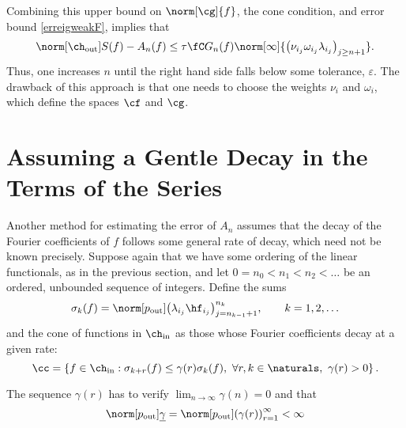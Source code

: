 \documentclass[final]{elsarticle}
\newcommand{\chin}{\ch_{\text{\rm{in}}}}
\newcommand{\chout}{\ch_{\text{\rm{out}}}}
\newcommand{\pout}{p_{\text{\rm{out}}}}
\theoremstyle{definition}
\theoremstyle{remark}
\begin{document}
Combining this upper bound on $\norm[\cg]{f}$, the cone condition, and error bound \eqref{erreigweakF}, implies that
\begin{equation*}
\norm[\chout]{S(f)-A_n(f)} \le \tau \fC G_n(f) \norm[\infty]{\left(\nu_{i_j} \omega_{i_j} \lambda_{i_j} \right)_{j\ge n+1}}.
\end{equation*}
Thus, one increases $n$ until the right hand side falls below some tolerance, $\varepsilon$.  The drawback of this approach is that one needs to choose the weights $\nu_i$ and $\omega_i$, which define the spaces $\cf$ and $\cg$.




\section{Assuming a Gentle Decay in the Terms of the Series}

Another method for estimating the error of $A_n$ assumes that the decay of the Fourier coefficients of $f$ follows some general rate of decay, which need not be known precisely.  Suppose again that we have some ordering of the linear functionals, as in the previous section, and let $0=n_0 < n_1 < n_2 < \ldots$ be an ordered, unbounded sequence of integers.  Define the sums
\begin{equation} \label{sumdef}
\sigma_k(f) = \norm[\pout]{ \left(\lambda_{i_j} \hf_{i_j} \right)_{j=n_{k-1}+1}^{n_k}}, \qquad k=1, 2, \ldots
\end{equation}
and the cone of functions in $\chin$ as those whose Fourier coefficients decay at a given rate:
\begin{equation} \label{decayconedef}
\cc = \left\{ f \in \chin : \sigma_{k+r}(f) \le \gamma(r) \sigma_k (f), \ \forall r, k \in \naturals, \ \gamma(r) > 0 \right\}.
\end{equation}

The sequence $\gamma(r)$ has to verify $\lim_{n\rightarrow\infty}\gamma(n)=0$ and that
\begin{equation} \label{constcone}
\norm[\pout]{\underline{\gamma}}=\norm[\pout]{ \left(\gamma(r)\right)_{r=1}^\infty}<\infty
\end{equation}
\end{document}
